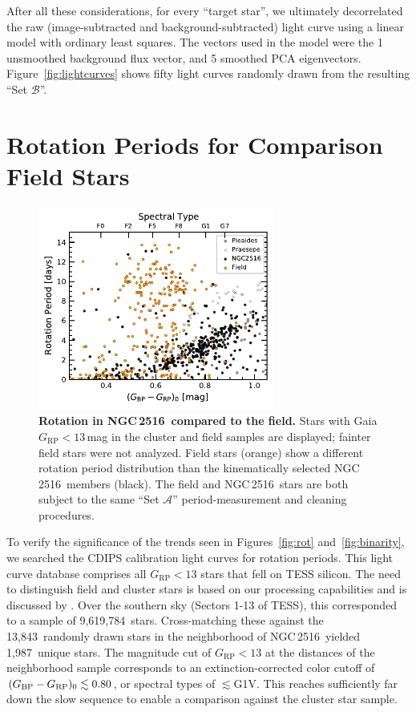 \documentclass[12pt,twocolumn,tighten]{aastex63}
\newcommand{\cn}{NGC\,2516} %
\newcommand{\nnbhd}{13{,}843} %
\newcommand{\ncalibration}{9{,}619{,}784} %
\newcommand{\nnbhdcalibstar}{1{,}987} %
\newcommand{\bpmrpo}{(G_{\rm BP}-G_{\rm RP})_0}
\begin{document}
After all these considerations, for every ``target star'', we
ultimately decorrelated the raw (image-subtracted and
background-subtracted) light curve using a linear model with ordinary
least squares.  The vectors used in the model were the 1
unsmoothed background flux vector, and 5 smoothed PCA eigenvectors.
Figure~\ref{fig:lightcurves} shows fifty light curves
randomly drawn from the resulting ``Set $\mathcal{B}$''.




\section{Rotation Periods for Comparison Field Stars}
\label{app:compstar}

\begin{figure}[t]
	\begin{center}
		\leavevmode
    \includegraphics[width=0.69\textwidth]{f9.pdf}
	\end{center}
	\vspace{-0.7cm}
	\caption{ {\bf Rotation in \cn\ compared to the field.}
  Stars with Gaia $G_\mathrm{RP}<13$\,mag in the cluster and field samples are
  displayed; fainter field stars were not analyzed.  Field
  stars (orange) show a different rotation period distribution than
  the kinematically selected \cn\ members (black).  The field and \cn\
  stars are both subject to the same ``Set $\mathcal{A}$''
  period-measurement and cleaning procedures.
  \label{fig:compstar}
	}
\end{figure}

To verify the significance of the trends seen in Figures~\ref{fig:rot}
and~\ref{fig:binarity}, we searched the CDIPS calibration light curves
for rotation periods.  This light curve database comprises all $G_\mathrm{RP}<13$
stars that fell on TESS silicon. The need to distinguish field and
cluster stars is based on our processing capabilities and is discussed
by \citet{bouma_cdipsI_2019}.  Over the southern sky (Sectors 1-13 of
TESS), this corresponded to a sample of \ncalibration\ stars.
Cross-matching these against the \nnbhd\ randomly drawn stars in the
neighborhood of \cn\ yielded \nnbhdcalibstar\ unique stars.  The
magnitude cut of $G_\mathrm{RP}<13$ at the distances of the neighborhood sample
corresponds to an extinction-corrected color cutoff of $\bpmrpo
\lesssim 0.80$, or spectral types of $\lesssim$G1V.  This reaches
sufficiently far down the slow sequence to enable a comparison against
the cluster star sample.
\end{document}
